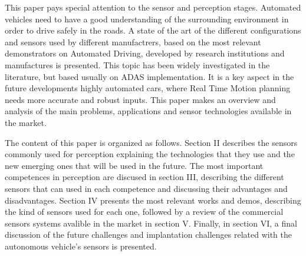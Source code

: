 This paper pays special attention to the sensor and perception stages. Automated vehicles need to have a good understanding of the surrounding environment in order to drive safely in the roads. A state of the art of the different configurations and sensors used by different manufactrers, based on the most relevant demonstrators on Automated Driving, developed by research institutions and manufactures is presented. This topic has been widely investigated in the literature, but based usually on ADAS implementation. It is a key aspect in the future developments highly automated cars, where Real Time Motion planning needs more accurate and robust inputs. This paper makes an overview and analysis of the main problems, applications and sensor technologies available in the market.

The content of this paper is organized as follows. Section II describes the sensors commonly used for perception explaining the technologies that they use and the new emerging ones that will be used in the future. The most important competences in perception are discused in section III, describing the different sensors that can used in each competence and discussing their advantages and disadvantages. Section IV presents the most relevant works and demos, describing the kind of sensors used for each one, followed by a review of the commercial sensors systems avalible in the market in section V. Finally, in section VI, a final discussion of the future challenges and implantation challenges related with the autonomous vehicle's sensors is presented. 
